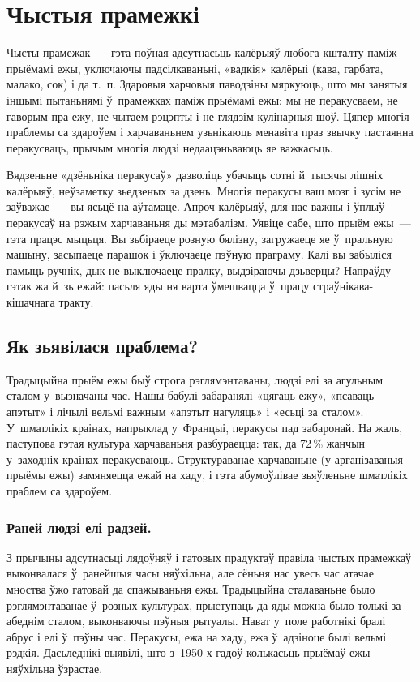 \chapter{Чыстыя прамежкі}

Чысты прамежак~--- гэта поўная адсутнасьць калёрыяў любога кшталту паміж прыёмамі ежы, уключаючы падсілкаваньні, «вадкія» калёрыі (кава, гарбата, малако, сок) і да т.~п. Здаровыя харчовыя паводзіны мяркуюць, што мы занятыя іншымі пытаньнямі ў~прамежках паміж прыёмамі ежы: мы не перакусваем, не гаворым пра ежу, не чытаем рэцэпты і не глядзім кулінарныя шоў. Цяпер многія праблемы са здароўем і харчаваньнем узьнікаюць менавіта праз звычку пастаянна перакусваць, прычым многія людзі недаацэньваюць яе важкасьць.

Вядзеньне «дзёньніка перакусаў» дазволіць убачыць сотні й~тысячы лішніх калёрыяў, неўзаметку зьедзеных за дзень. Многія перакусы ваш мозг і зусім не заўважае~--- вы ясьцё на аўтамаце. Апроч калёрыяў, для нас важны і ўплыў перакусаў на рэжым харчаваньня ды мэтабалізм. Уявіце сабе, што прыём ежы~--- гэта працэс мыцьця. Вы зьбіраеце розную бялізну, загружаеце яе ў~пральную машыну, засыпаеце парашок і ўключаеце пэўную праграму. Калі вы забыліся памыць ручнік, дык не выключаеце пралку, выдзіраючы дзьверцы? Напраўду гэтак жа й~зь ежай: пасьля яды ня варта ўмешвацца ў~працу страўнікава-кішачнага тракту.

\section{Як зьявілася праблема?}

Традыцыйна прыём ежы быў строга рэглямэнтаваны, людзі елі за агульным сталом у~вызначаны час. Нашы бабулі забаранялі «цягаць ежу», «псаваць апэтыт» і лічылі вельмі важным «апэтыт нагуляць» і «есьці за сталом». У~шматлікіх краінах, напрыклад у~Францыі, перакусы пад забаронай. На жаль, паступова гэтая культура харчаваньня разбураецца: так, да 72\,\% жанчын у~заходніх краінах перакусваюць. Структураванае харчаваньне (у арганізаваныя прыёмы ежы) замяняецца ежай на хаду, і гэта абумоўлівае зьяўленьне шматлікіх праблем са здароўем.

\subsection{Раней людзі елі радзей.}
З прычыны адсутнасьці лядоўняў і гатовых прадуктаў правіла чыстых прамежкаў выконвалася ў~ранейшыя часы няўхільна, але сёньня нас увесь час атачае мноства ўжо гатовай да спажываньня ежы. Традыцыйна сталаваньне было рэглямэнтаванае ў~розных культурах, прыступаць да яды можна было толькі за абеднім сталом, выконваючы пэўныя рытуалы. Нават у~поле работнікі бралі абрус і елі ў~пэўны час. Перакусы, ежа на хаду, ежа ў~адзіноце былі вельмі рэдкія. Дасьледнікі выявілі, што з~1950-х гадоў колькасьць прыёмаў ежы няўхільна ўзрастае.

